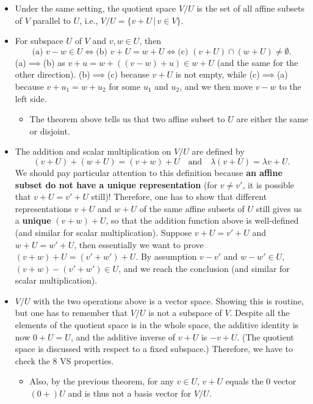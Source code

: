 \documentclass[11pt]{article}
\newcommand{\where}{\,|\,}
\begin{document}
\begin{itemize}
\begin{itemize}
    \end{itemize}
    \item Under the same setting, the quotient space $V/U$ is the set of all affine subsets of $V$ parallel to $U$, i.e., $V/U = \{v+U \where v \in V\}$.
    \item For subspace $U$ of $V$ and $v,w \in U$, then
        \begin{equation*}
            \text{(a) } v-w \in U \iff \text{(b) } v+U = w+U \iff \text{(c) } (v+U) \cap (w+U) \not= \emptyset.
        \end{equation*}
    (a)$\implies$(b) as $v+u = w+((v-w)+u) \in w+U$ (and the same for the other direction). (b)$\implies$(c) because $v+U$ is not empty, while (c)$\implies$(a) because $v+u_1=w+u_2$ for some $u_1$ and $u_2$, and we then move $v-w$ to the left side.
    \begin{itemize}
        \item The theorem above tells us that two affine subset to $U$ are either the same or  disjoint.
    \end{itemize}
    \item The addition and scalar multiplication on $V/U$ are defined by  $$(v+U)+(w+U) = (v+w)+U \quad \text{and} \quad \lambda(v+U) = \lambda v + U.$$ We should pay particular attention to this definition because \textbf{an affine subset do not have a unique representation} (for $v \not= v'$, it is possible that $v+U = v'+U$ still)! Therefore, one has to show that  different representations $v+U$ and $w+U$ of the same affine subsets of $U$ still gives us a \textbf{unique} $(v+w)+U$, so that the addition function above is well-defined (and similar for scalar multiplication). Suppose $v+U = v'+U$ and $w+U = w'+U$, then essentially we want to prove $(v+w)+U=(v'+w')+U$. By assumption $v-v'$ and $w-w' \in U$, $(v+w)-(v'+w') \in U$, and we reach the conclusion (and similar for scalar multiplication).
    \item $V/U$ with the two operations above is a vector space. Showing this is routine, but one has to remember that $V/U$ is not a subspace of $V$. Despite all the elements of the quotient space is in the whole space, the additive identity is now $0+U=U$, and the additive inverse of $v+U$ is $-v+U$. (The quotient space is discussed with respect to a fixed subspace.) Therefore, we have to check the 8 VS properties.
    \begin{itemize}
        \item Also, by the previous theorem, for any $v \in U$, $v+U$ equals the 0 vector $(0+)U$ and is thus not a basis vector for $V/U$.

\end{itemize}
\end{itemize}
\end{document}

